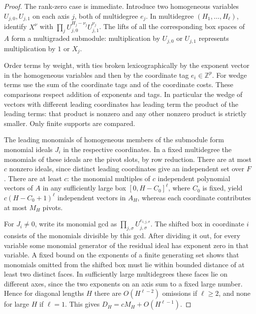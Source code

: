 \documentclass[11pt,a4paper,reqno]{amsart}
\theoremstyle{definition}
\theoremstyle{remark}
\numberwithin{equation}{section}
\begin{document}
\begin{proof}
The rank-zero case is immediate. Introduce two homogeneous
variables \(U_{j,0},U_{j,1}\) on each axis \(j\), both of
multidegree \(e_j\). In multidegree \((H_1,\ldots,H_\ell)\),
identify \(X^\nu\) with
\(\prod_j U_{j,0}^{H_j-\nu_j}U_{j,1}^{\nu_j}\).
The lifts of all the corresponding box spaces of \(A\) form a
multigraded submodule: multiplication by \(U_{j,0}\) or
\(U_{j,1}\) represents multiplication by \(1\) or \(X_j\).

Order terms by weight, with ties broken lexicographically by
the exponent vector in the homogeneous variables and then by
the coordinate tag \(e_i\in\mathbb Z^p\). For wedge terms
use the sum of the coordinate tags and of the coordinate costs.
These comparisons respect addition of exponents and tags.
In particular the wedge of vectors with different leading
coordinates has leading term the product of the leading terms:
that product is nonzero and any other nonzero product is
strictly smaller. Only finite supports are compared.

The leading monomials of homogeneous members of the submodule
form monomial ideals \(J_i\) in the respective coordinates.
In a fixed multidegree the monomials of these ideals are the
pivot slots, by row reduction. There are at most \(c\) nonzero
ideals, since distinct leading coordinates give an independent
set over \(F\). There are at least \(c\): the monomial multiples
of \(c\) independent polynomial vectors of \(A\) in any
sufficiently large box \([0,H-C_0]^\ell\), where \(C_0\) is
fixed, yield \(c(H-C_0+1)^\ell\) independent vectors in \(A_H\),
whereas each coordinate contributes at most \(M_H\) pivots.

For \(J_i\ne0\), write its monomial gcd as
\(\prod_{j,\sigma} U_{j,\sigma}^{e_{i,j,\sigma}}\). The shifted
box in coordinate \(i\) consists of the monomials divisible
by this gcd. After dividing it out, for every variable some
monomial generator of the residual ideal has exponent zero
in that variable. A fixed bound on the exponents of a finite
generating set shows that monomials omitted from the shifted
box must lie within bounded distance of at least two distinct
faces. In sufficiently large multidegrees these faces lie on
different axes, since the two exponents on an axis sum to a
fixed large number. Hence for diagonal lengths \(H\) there
are \(O(H^{\ell-2})\) omissions if \(\ell\ge2\), and none for
large \(H\) if \(\ell=1\). This gives \(D_H=cM_H+O(H^{\ell-1})\).


\end{proof}
\end{document}
